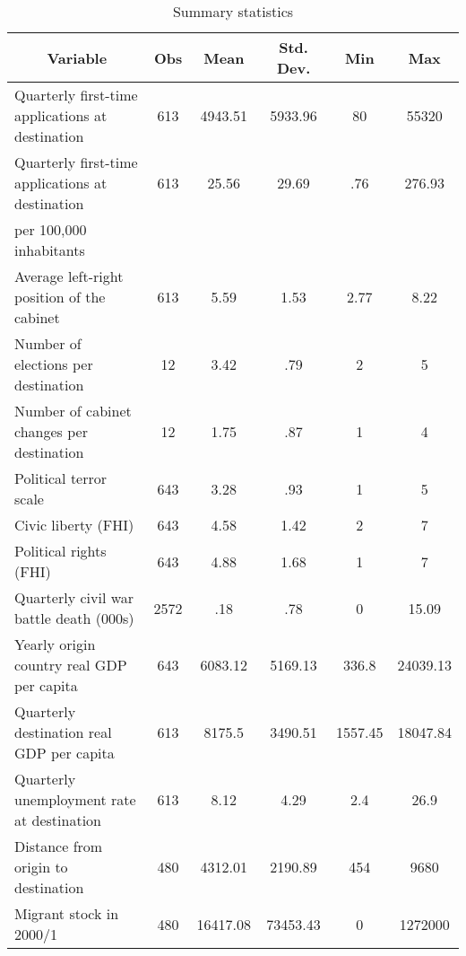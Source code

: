 \begin{table}[!ht]\centering \footnotesize
	\caption{Summary statistics\label{sumstat}}
\begin{tabular}{l c c c c c }\hline\hline
\multicolumn{1}{c}{Variable} & Obs & Mean & Std. Dev. & Min & Max  \\ \hline
Quarterly first-time applications at destination & 613 & 4943.51 & 5933.96 & 80 & 55320  \\
[0.2em]
Quarterly first-time applications at destination  & 613 & 25.56 & 29.69 & .76 & 276.93  \\
per 100,000 inhabitants & & & & & \\
[0.2em]
Average left-right position of the cabinet & 613 & 5.59 & 1.53 & 2.77 & 8.22  \\
[0.2em]
Number of elections per destination & 12 & 3.42 & .79 & 2 & 5  \\
[0.2em]
Number of cabinet changes per destination & 12 & 1.75 & .87 & 1 & 4  \\
[0.2em]
Political terror scale & 643 & 3.28 & .93 & 1 & 5  \\
[0.2em]
Civic liberty (FHI) & 643 & 4.58 & 1.42 & 2 & 7  \\
[0.2em]
Political rights (FHI) & 643 & 4.88 & 1.68 & 1 & 7  \\
[0.2em]
Quarterly civil war battle death (000s) & 2572 & .18 & .78 & 0 & 15.09  \\
[0.2em]
Yearly origin country real GDP per capita & 643 & 6083.12 & 5169.13 & 336.8 & 24039.13  \\
[0.2em]
Quarterly destination real GDP per capita & 613 & 8175.5 & 3490.51 & 1557.45 & 18047.84  \\
[0.2em]
Quarterly unemployment rate at destination & 613 & 8.12 & 4.29 & 2.4 & 26.9  \\
[0.2em]
Distance from origin to destination & 480 & 4312.01 & 2190.89 & 454 & 9680  \\
[0.2em]
Migrant stock in 2000/1 & 480 & 16417.08 & 73453.43 & 0 & 1272000  \\
\hline\end{tabular}
\end{table}
